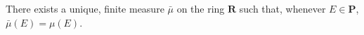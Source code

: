 There exists a unique, finite measure $\bar{\mu}$ on the ring $\mathbf{R}$ such that, whenever $E \in \mathbf{P}$, $\bar{\mu}(E) = \mu(E)$.
